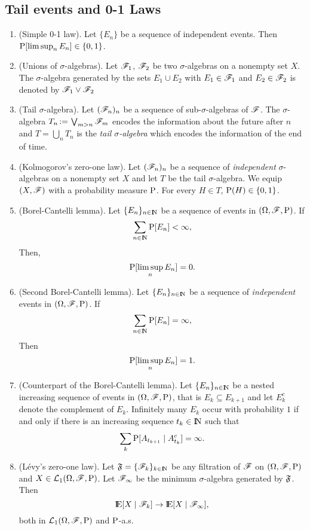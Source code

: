 \documentclass[a4paper,10pt]{article}
\begin{document}
\subsection{Tail events and 0-1 Laws}
\begin{enumerate}

 \item (Simple 0-1 law). Let $\{E_n\}$ be a sequence of independent events. Then $\mathrm{P}[\limsup_n E_n]\in \{0,1\}$.
 \item (Unions of $\sigma$-algebras). Let $\mathscr{F}_1$, $\mathscr{F}_2$ be two $\sigma$-algebras on a nonempty set $X$.
       The $\sigma$-algebra generated by the sets $E_1\cup E_2$ with $E_1\in\mathscr{F}_1$ and $E_2\in\mathscr{F}_2$ is 
       denoted by $\mathscr{F}_1 \vee \mathscr{F}_2$
 
 \item (Tail $\sigma$-algebra). Let $(\mathscr{F}_n)_{n}$ be a sequence of sub-$\sigma$-algebras of $\mathscr{F}$.
       The $\sigma$-algebra $T_n{}\mathop{\mathrel{:}=}{} \bigvee_{m>n}\mathscr{F}_m$ encodes the information about the future 
       after $n$ and $T=\bigcup_n T_n$ is the \textit{tail $\sigma$-algebra} which encodes the 
       information of the end of time. 
 
 \item (Kolmogorov's zero-one law). Let $(\mathscr{F}_n)_n$ be a sequence of \textit{independent}
       $\sigma$-algebras on a nonempty set $X$ and let $T$ be the tail $\sigma$-algebra.
       We equip $(X,\mathscr{F})$ with a probability measure $\mathrm{P}$. For every $H\in T$,
       $\mathrm{P}(H)\in\{0,1\}$.
 
 \item (Borel-Cantelli lemma). Let $\{E_n\}_{n\in\N}$ be a sequence of events in $(\Omega,\mathscr{F},\mathrm{P})$. If
 \[
  \sum_{n\in\N}\prob[E_n] < \infty,
 \]
 Then,
 \[
  \mathrm{P}[\limsup_n E_n] = 0.
 \]

 \item (Second Borel-Cantelli lemma). Let $\{E_n\}_{n\in\N}$ be a sequence of \textit{independent} events in $(\Omega,\mathscr{F},\mathrm{P})$. If
 \[
  \sum_{n\in\N}\prob[E_n] = \infty,
 \]
 Then
 \[
  \mathrm{P}[\limsup_n E_n] = 1.
 \]
 \item (Counterpart of the Borel-Cantelli lemma). 
 Let $\{E_n\}_{n\in\N}$ be a nested increasing sequence of events in $(\Omega,\mathscr{F},\mathrm{P})$, that is 
 $E_k\subseteq E_{k+1}$ and let $E_k^c$ denote the complement of $E_k$.
 Infinitely many $E_k$ occur with probability $1$ if and only if there is an increasing sequence 
 $t_k\in\N$ such that
 \[
  \sum_k \mathrm{P}[A_{t_{k+1}}\mid A_{t_k}^c]  = \infty.
 \] 
 
 \item (L\'evy's zero-one law). Let $\Ff=\{\F_k\}_{k\in\N}$ be any filtration of $\mathscr{F}$ on $(\Omega,\mathscr{F},\mathrm{P})$ and
 $X\in\mathcal{L}_1(\Omega,\mathscr{F},\mathrm{P})$. Let $\mathscr{F}_\infty$ be the minimum $\sigma$-algebra generated by $\mathfrak{F}$. Then
 \[
  \E[X\mid \F_k] \to \E[X\mid \F_\infty], 
 \]
 both in $\mathcal{L}_1(\Omega,\mathscr{F},\mathrm{P})$ and $\mathrm{P}$-a.s.

 

\end{enumerate}
\end{document}
